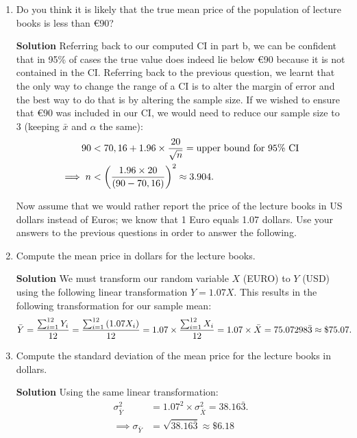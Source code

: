 \begin{enumerate}
\begin{enumerate}
        \item Do you think it is likely that the true mean price of the population of lecture books is less than \euro{90}?
        \begin{framed}{\textbf{Solution}}
        Referring back to our computed CI in part b, we can be confident that in 95\% of cases the true value does indeed lie below \euro{90} because it is not contained in the CI. Referring back to the previous question, we learnt that the only way to change the range of a CI is to alter the margin of error and the best way to do that is by altering the sample size. If we wished to ensure that \euro{90} was included in our CI, we would need to reduce our sample size to 3 (keeping $\bar{x}$ and $\alpha$ the same):
        \begin{align}
            90 &< 70,16 + 1.96 \times \frac{20}{\sqrt{n}} = \text{upper bound for 95\% CI} \\
            \implies n &< \left( \frac{1.96 \times 20}{\left( 90 - 70,16\right)}\right)^2 \approx 3.904.
        \end{align}
        \end{framed}
        Now assume that we would rather report the price of the lecture books in US dollars instead of Euros; we know that 1 Euro equals 1.07 dollars. Use your answers to the previous questions in order to answer the following.
        \item Compute the mean price in dollars for the lecture books.
        \begin{framed}{\textbf{Solution}}
        We must transform our random variable $X$ (EURO) to $Y$ (USD) using the following linear transformation $Y = 1.07 X$. This results in the following transformation for our sample mean:
        \begin{align}
            \bar{Y} &= \frac{\sum_{i=1}^{12} Y_i}{12} = \frac{\sum_{i=1}^{12} \left( 1.07 X_i\right)}{12} = 1.07 \times \frac{\sum_{i=1}^{12} X_i}{12} = 1.07 \times \bar{X} = 75.07298\bar{3} \approx \$ 75.07.
        \end{align}
        \end{framed}
        
        \item Compute the standard deviation of the mean price for the lecture books in dollars.
        \begin{framed}{\textbf{Solution}}
        Using the same linear transformation:
        \begin{align}
            \sigma_{\bar{Y}}^2 &= 1.07^2 \times \sigma_{\bar{X}}^2 = 38.16\bar{3}. \\
            \implies \sigma_{\bar{Y}} &= \sqrt{38.16\bar{3}} \approx \$ 6.18
        \end{align}
        \end{framed}
        

\end{enumerate}
\end{enumerate}
